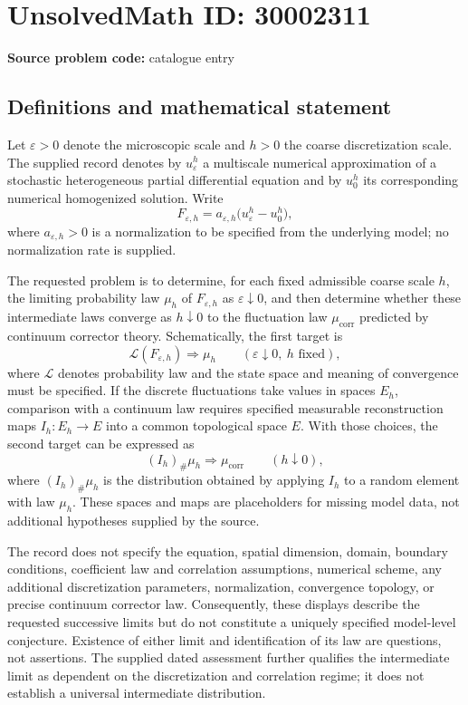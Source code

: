 \documentclass[11pt]{article}
\begin{document}
\section*{UnsolvedMath ID: 30002311}
\textbf{Source problem code:} catalogue entry
\subsection{Definitions and mathematical statement}
Let \(\varepsilon>0\) denote the microscopic scale and \(h>0\) the coarse discretization scale. The supplied record denotes by \(u_\varepsilon^h\) a multiscale numerical approximation of a stochastic heterogeneous partial differential equation and by \(u_0^h\) its corresponding numerical homogenized solution. Write
\[
F_{\varepsilon,h}=a_{\varepsilon,h}\bigl(u_\varepsilon^h-u_0^h\bigr),
\]
where \(a_{\varepsilon,h}>0\) is a normalization to be specified from the underlying model; no normalization rate is supplied.

The requested problem is to determine, for each fixed admissible coarse scale \(h\), the limiting probability law \(\mu_h\) of \(F_{\varepsilon,h}\) as \(\varepsilon\downarrow0\), and then determine whether these intermediate laws converge as \(h\downarrow0\) to the fluctuation law \(\mu_{\mathrm{corr}}\) predicted by continuum corrector theory. Schematically, the first target is
\[
\mathcal L(F_{\varepsilon,h})\Longrightarrow\mu_h
\qquad(\varepsilon\downarrow0,\ h\text{ fixed}),
\]
where \(\mathcal L\) denotes probability law and the state space and meaning of convergence must be specified. If the discrete fluctuations take values in spaces \(E_h\), comparison with a continuum law requires specified measurable reconstruction maps \(I_h:E_h\to E\) into a common topological space \(E\). With those choices, the second target can be expressed as
\[
(I_h)_\#\mu_h\Longrightarrow\mu_{\mathrm{corr}}
\qquad(h\downarrow0),
\]
where \((I_h)_\#\mu_h\) is the distribution obtained by applying \(I_h\) to a random element with law \(\mu_h\). These spaces and maps are placeholders for missing model data, not additional hypotheses supplied by the source.

The record does not specify the equation, spatial dimension, domain, boundary conditions, coefficient law and correlation assumptions, numerical scheme, any additional discretization parameters, normalization, convergence topology, or precise continuum corrector law. Consequently, these displays describe the requested successive limits but do not constitute a uniquely specified model-level conjecture. Existence of either limit and identification of its law are questions, not assertions. The supplied dated assessment further qualifies the intermediate limit as dependent on the discretization and correlation regime; it does not establish a universal intermediate distribution.
\end{document}
